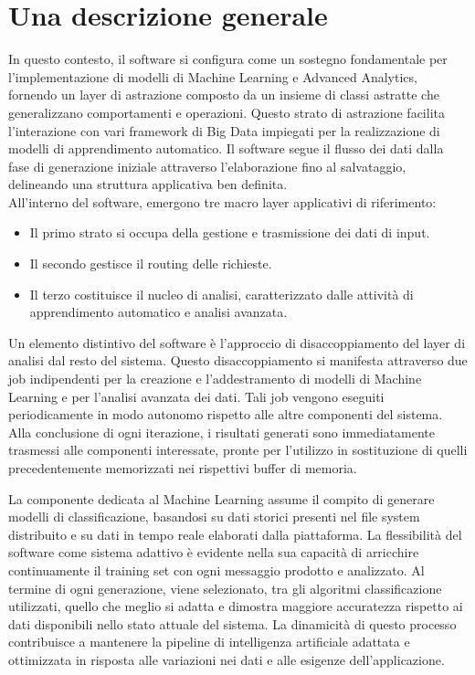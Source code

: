 \section[Descrizione generale]{Una descrizione generale}
In questo contesto, il software si configura come un sostegno fondamentale per l'implementazione di modelli di Machine Learning e Advanced Analytics, fornendo un layer di astrazione composto da un insieme di classi astratte che generalizzano comportamenti e operazioni.
Questo strato di astrazione facilita l'interazione con vari framework di Big Data impiegati per la realizzazione di modelli di apprendimento automatico.
Il software segue il flusso dei dati dalla fase di generazione iniziale attraverso l'elaborazione fino al salvataggio, delineando una struttura applicativa ben definita. \\
All'interno del software, emergono tre macro layer applicativi di riferimento:
\begin{itemize}
    \item Il primo strato si occupa della gestione e trasmissione dei dati di input.
    \item Il secondo gestisce il routing delle richieste.
    \item Il terzo costituisce il nucleo di analisi, caratterizzato dalle attività di apprendimento automatico e analisi avanzata.
\end{itemize}

Un elemento distintivo del software è l'approccio di disaccoppiamento del layer di analisi dal resto del sistema.
Questo disaccoppiamento si manifesta attraverso due job indipendenti per la creazione e l'addestramento di modelli di Machine Learning e per l'analisi avanzata dei dati.
Tali job vengono eseguiti periodicamente in modo autonomo rispetto alle altre componenti del sistema.
Alla conclusione di ogni iterazione, i risultati generati sono immediatamente trasmessi alle componenti interessate, pronte per l'utilizzo in sostituzione di quelli precedentemente memorizzati nei rispettivi buffer di memoria.

La componente dedicata al Machine Learning assume il compito di generare modelli di classificazione, basandosi su dati storici presenti nel file system distribuito e su dati in tempo reale elaborati dalla piattaforma.
La flessibilità del software come sistema adattivo è evidente nella sua capacità di arricchire continuamente il training set con ogni messaggio prodotto e analizzato.
Al termine di ogni generazione, viene selezionato, tra gli algoritmi classificazione utilizzati, quello che meglio si adatta e dimostra maggiore accuratezza rispetto ai dati disponibili nello stato attuale del sistema.
La dinamicità di questo processo contribuisce a mantenere la pipeline di intelligenza artificiale adattata e ottimizzata in risposta alle variazioni nei dati e alle esigenze dell'applicazione.

